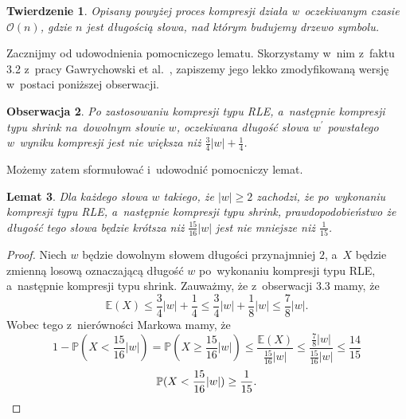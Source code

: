 \documentclass[declaration,shortabstract]{iithesis}
\theoremstyle{definition} \newtheorem{definition}{Definicja}[chapter]
\theoremstyle{plain} \newtheorem{remark}[definition]{Obserwacja}
\theoremstyle{plain} \newtheorem{theorem}[definition]{Twierdzenie}
\theoremstyle{plain} \newtheorem{example}{Przykład}[definition]
\theoremstyle{plain} \newtheorem{lemma}[definition]{Lemat}
\begin{document}
\begin{theorem}
    Opisany powyżej proces kompresji działa w~oczekiwanym czasie $\mathcal{O}(n)$, gdzie $n$ jest długością słowa, nad którym budujemy drzewo symbolu.
\end{theorem}

Zacznijmy od udowodnienia pomocniczego lematu. Skorzystamy w~nim z~faktu 3.2 z~pracy Gawrychowski et al.~\cite{gawrychowski}, zapiszemy jego lekko zmodyfikowaną wersję w~postaci poniższej obserwacji.
\begin{remark}
    Po zastosowaniu kompresji typu RLE, a~następnie kompresji typu shrink na~dowolnym słowie $w$, oczekiwana długość słowa $w^\prime$ powstałego w~wyniku kompresji jest nie większa niż $\frac{3}{4}|w| + \frac{1}{4}$.
\end{remark}
Możemy zatem sformułować i~udowodnić pomocniczy lemat.
\begin{lemma}
    Dla każdego słowa $w$ takiego, że $|w| \geq 2$ zachodzi, że po~wykonaniu kompresji typu RLE, a~następnie kompresji typu shrink, prawdopodobieństwo że długość tego słowa będzie krótsza niż $\frac{15}{16}|w|$ jest nie mniejsze niż $\frac{1}{15}$. 
\end{lemma}
\begin{proof}
    Niech $w$ będzie dowolnym słowem długości przynajmniej $2$, a~$X$ będzie zmienną losową oznaczającą długość $w$ po~wykonaniu kompresji typu RLE, a~następnie kompresji typu shrink. Zauważmy, że z~obserwacji 3.3 mamy, że $$\mathbb{E} (X) \leq \frac{3}{4}|w| + \frac{1}{4} \leq \frac{3}{4}|w| + \frac{1}{8}|w| \leq \frac{7}{8}|w|.$$ Wobec tego z~nierówności Markowa mamy, że $$1 - \mathbb{P}(X < \frac{15}{16}|w|) = \mathbb{P}(X \geq \frac{15}{16}|w|) \leq \frac{\mathbb{E} (X)}{\frac{15}{16}|w|} \leq \frac{\frac{7}{8}|w|}{\frac{15}{16}|w|} \leq \frac{14}{15}$$ $$\mathbb{P}(X < \frac{15}{16}|w|) \geq \frac{1}{15}. \qedhere$$
\end{proof}
\end{document}

